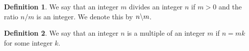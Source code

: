 \documentclass{article}
\theoremstyle{definition}
\newtheorem{definition}{Definition}
\begin{document}
\begin{definition}
	We say that an integer \(m\) divides an integer \(n\) if \(m>0\) and the ratio \(n/m\) is an integer. We denote this by \(n\symbol{92} m\). 
\end{definition}

\begin{definition}
	We say that an integer \(n\) is a multiple of an integer \(m\) if \(n=mk\) for some integer \(k\).
\end{definition}
\end{document}
